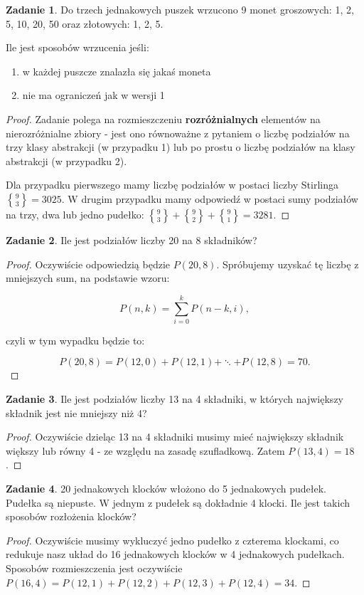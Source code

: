 \documentclass[11pt]{article}
\theoremstyle{definition}
\newtheorem{zadanie}{Zadanie}
\numberwithin{zadanie}{subsection}
\DeclareRobustCommand{\stirling}{\genfrac\{\}{0pt}{}}
\begin{document}
\begin{zadanie}
    Do trzech jednakowych puszek wrzucono 9 monet groszowych: 1, 2, 5, 10, 20, 50 oraz złotowych: 1, 2, 5.

    Ile jest sposobów wrzucenia jeśli:
    \begin{enumerate}
        \item w każdej puszcze znalazła się jakaś moneta

        \item nie ma ograniczeń jak w wersji 1
    \end{enumerate}

\end{zadanie}
\begin{proof}
    Zadanie polega na rozmieszczeniu \textbf{rozróżnialnych} elementów na nierozróżnialne zbiory - jest ono równoważne z pytaniem o liczbę podziałów na trzy klasy abstrakcji (w przypadku 1) lub po prostu o liczbę podziałów na klasy abstrakcji (w przypadku 2).

    Dla przypadku pierwszego mamy liczbę podziałów w postaci liczby Stirlinga $\stirling 9 3=3025$. W drugim przypadku mamy odpowiedź w postaci sumy podziałów na trzy, dwa lub jedno pudełko: $\stirling93+\stirling92+\stirling91=3281$.
\end{proof}

\begin{zadanie}
    Ile jest podziałów liczby 20 na 8 składników?
\end{zadanie}
\begin{proof}
    Oczywiście odpowiedzią będzie $P(20,8)$. Spróbujemy uzyskać tę liczbę z mniejszych sum, na podstawie wzoru:

    $$P(n,k) = \sum_{i=0}^kP(n-k,i),$$

    czyli w tym wypadku będzie to:

    $$P(20,8) = P(12,0)+P(12,1)+\ddots+P(12,8)=70.$$
\end{proof}
\begin{zadanie}
    Ile jest podziałów liczby 13 na 4 składniki, w których największy składnik jest nie mniejszy niż 4?
\end{zadanie}
\begin{proof}
    Oczywiście dzieląc 13 na 4 składniki musimy mieć największy składnik większy lub równy 4 - ze względu na zasadę szufladkową. Zatem $P(13,4)=18$.
\end{proof}

\begin{zadanie}
    20 jednakowych klocków włożono do 5 jednakowych pudełek. Pudełka są niepuste. W jednym z pudełek są dokładnie 4 klocki. Ile jest takich sposobów rozłożenia klocków?
\end{zadanie}
\begin{proof}
    Oczywiście musimy wykluczyć jedno pudełko z czterema klockami, co redukuje nasz układ do 16 jednakowych klocków w 4 jednakowych pudełkach. Sposobów rozmieszczenia jest oczywiście $P(16,4)=P(12,1)+P(12,2)+P(12,3)+P(12,4)=34$.
\end{proof}
\end{document}
